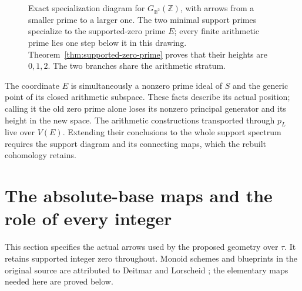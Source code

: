 \documentclass[11pt,a4paper]{article}
\theoremstyle{definition}\newtheorem{definition}[theorem]{Definition}
\newcommand{\Z}{\mathbb Z}\newcommand{\Q}{\mathbb Q}
\newcommand{\B}{\mathbb B}\newcommand{\N}{\mathbb N}
\begin{document}
\begin{figure}[ht]
\centering
{}
\caption{Exact specialization diagram for $G_{\B^2}(\Z)$, with arrows from a smaller prime to a larger one. The two minimal support primes specialize to the supported-zero prime $E$; every finite arithmetic prime lies one step below it in this drawing. Theorem~\ref{thm:supported-zero-prime} proves that their heights are $0,1,2$. The two branches share the arithmetic stratum.}
\label{fig:e-prime}
\end{figure}

The coordinate $E$ is simultaneously a nonzero prime ideal of $S$ and the generic point of its closed arithmetic subspace. These facts describe its actual position; calling it the old zero prime alone loses its nonzero principal generator and its height in the new space. The arithmetic constructions transported through $p_L$ live over $V(E)$. Extending their conclusions to the whole support spectrum requires the support diagram and its connecting maps, which the rebuilt cohomology retains.

\section{The absolute-base maps and the role of every integer}
\label{sec:absolute-base-maps}
This section specifies the actual arrows used by the proposed geometry over
$\tau$. It retains supported integer zero throughout. Monoid schemes and
blueprints in the original source are attributed to Deitmar and Lorscheid
\cite{deitmar,lorscheid}; the elementary maps needed here are proved below.
\end{document}
